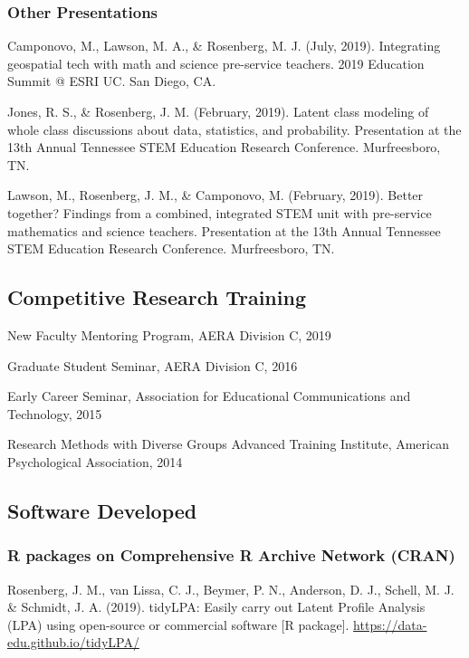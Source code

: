 \documentclass[14,]{article}
\begin{document}
\hypertarget{other-presentations}{%
\subsubsection{Other Presentations}\label{other-presentations}}

Camponovo, M., Lawson, M. A., \& Rosenberg, M. J. (July, 2019).
Integrating geospatial tech with math and science pre-service teachers.
2019 Education Summit @ ESRI UC. San Diego, CA.

Jones, R. S., \& Rosenberg, J. M. (February, 2019). Latent class
modeling of whole class discussions about data, statistics, and
probability. Presentation at the 13th Annual Tennessee STEM Education
Research Conference. Murfreesboro, TN.

Lawson, M., Rosenberg, J. M., \& Camponovo, M. (February, 2019). Better
together? Findings from a combined, integrated STEM unit with
pre-service mathematics and science teachers. Presentation at the 13th
Annual Tennessee STEM Education Research Conference. Murfreesboro, TN.

\hypertarget{competitive-research-training}{%
\subsection{Competitive Research
Training}\label{competitive-research-training}}

New Faculty Mentoring Program, AERA Division C, 2019

Graduate Student Seminar, AERA Division C, 2016

Early Career Seminar, Association for Educational Communications and
Technology, 2015

Research Methods with Diverse Groups Advanced Training Institute,
American Psychological Association, 2014

\hypertarget{software-developed}{%
\subsection{Software Developed}\label{software-developed}}

\hypertarget{r-packages-on-comprehensive-r-archive-network-cran}{%
\subsubsection{R packages on Comprehensive R Archive Network
(CRAN)}\label{r-packages-on-comprehensive-r-archive-network-cran}}

Rosenberg, J. M., van Lissa, C. J., Beymer, P. N., Anderson, D. J.,
Schell, M. J. \& Schmidt, J. A. (2019). tidyLPA: Easily carry out Latent
Profile Analysis (LPA) using open-source or commercial software {[}R
package{]}. \url{https://data-edu.github.io/tidyLPA/}
\end{document}
